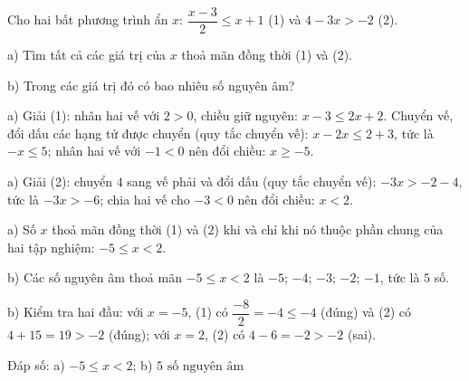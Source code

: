 \begin{problem}[9DS-BPT-042]
Cho hai bất phương trình ẩn $x$: $\dfrac{x - 3}{2} \leq x + 1$ (1) và $4 - 3x > -2$ (2).

a) Tìm tất cả các giá trị của $x$ thoả mãn đồng thời (1) và (2).

b) Trong các giá trị đó có bao nhiêu số nguyên âm?

\begin{solution}
a) Giải (1): nhân hai vế với $2 > 0$, chiều giữ nguyên: $x - 3 \leq 2x + 2$. Chuyển vế, đổi dấu các hạng tử được chuyển (quy tắc chuyển vế): $x - 2x \leq 2 + 3$, tức là $-x \leq 5$; nhân hai vế với $-1 < 0$ nên đổi chiều: $x \geq -5$.

a) Giải (2): chuyển $4$ sang vế phải và đổi dấu (quy tắc chuyển vế): $-3x > -2 - 4$, tức là $-3x > -6$; chia hai vế cho $-3 < 0$ nên đổi chiều: $x < 2$.

a) Số $x$ thoả mãn đồng thời (1) và (2) khi và chỉ khi nó thuộc phần chung của hai tập nghiệm: $-5 \leq x < 2$.

b) Các số nguyên âm thoả mãn $-5 \leq x < 2$ là $-5$; $-4$; $-3$; $-2$; $-1$, tức là $5$ số.

b) Kiểm tra hai đầu: với $x = -5$, (1) có $\dfrac{-8}{2} = -4 \leq -4$ (đúng) và (2) có $4 + 15 = 19 > -2$ (đúng); với $x = 2$, (2) có $4 - 6 = -2 > -2$ (sai).

Đáp số: a) $\boxed{-5 \leq x < 2}$; b) $\boxed{5 \text{ số nguyên âm}}$
\end{solution}
\end{problem}

